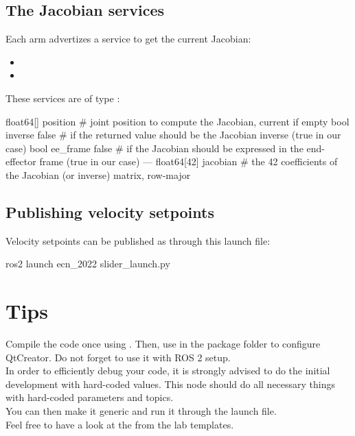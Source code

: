 \documentclass{ecnreport}
\begin{document}
\subsection{The Jacobian services}

Each arm advertizes a service to get the current Jacobian:
\begin{itemize}
 \item {}
 \item {}
\end{itemize}
These services are of type :
\begin{cppcode}
float64[] position      # joint position to compute the Jacobian, current if empty
bool inverse false      # if the returned value should be the Jacobian inverse (true in our case)
bool ee_frame false     # if the Jacobian should be expressed in the end-effector frame (true in our case)
---
float64[42] jacobian   # the 42 coefficients of the Jacobian (or inverse) matrix, row-major
\end{cppcode}

\subsection{Publishing velocity setpoints}

Velocity setpoints can be published as  through this launch file:
\begin{bashcodelarge}
 ros2 launch ecn_2022 slider_launch.py
\end{bashcodelarge}

\section{Tips}

Compile the code once using . Then, use  in the package folder to configure QtCreator. Do not forget to use it with ROS 2 setup.\\

In order to efficiently debug your code, it is strongly advised to do the initial development with hard-coded values.
This node should do all necessary things with hard-coded parameters and topics.\\
You can then make it generic and run it through the launch file.\\

Feel free to have a look at the  from the lab templates.\\
\end{document}
